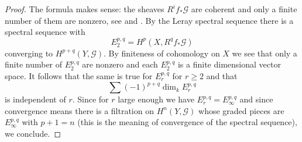 \begin{proof}
The formula makes sense: the sheaves $R^if_*\mathcal{G}$ are coherent
and only a finite number of them are nonzero, see
\cite[\href{http://stacks.math.columbia.edu/tag/08AR}{Tag 08AR}]{stacks-project}
and \cite[\href{http://stacks.math.columbia.edu/tag/073G}{Tag
073G}]{stacks-project}. By the Leray spectral sequence
\cite[\href{http://stacks.math.columbia.edu/tag/0732}{Tag 0732}]{stacks-project}
there is a spectral
sequence with
$$
E_2^{p, q} = H^p(X, R^qf_*\mathcal{G})
$$
converging to $H^{p + q}(Y, \mathcal{G})$. By finiteness of cohomology
on $X$ we see that only a finite number of $E_2^{p, q}$ are nonzero
and each $E_2^{p, q}$ is a finite dimensional vector space. It follows
that the same is true for $E_r^{p, q}$ for $r \geq 2$ and that
$$
\sum (-1)^{p + q} \dim_k E_r^{p, q}
$$
is independent of $r$. Since for $r$ large enough we have
$E_r^{p, q} = E_\infty^{p, q}$ and since convergence means there
is a filtration on $H^n(Y, \mathcal{G})$ whose graded pieces are
$E_\infty^{p, q}$ with $p + 1 = n$ (this is the meaning of convergence
of the spectral sequence), we conclude.
\end{proof}

